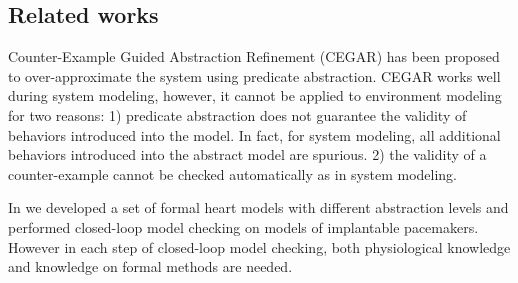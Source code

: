\subsection{Related works}
Counter-Example Guided Abstraction Refinement (CEGAR) \cite{CEGAR} has been proposed to over-approximate the system using predicate abstraction. 
CEGAR works well during system modeling, however, it cannot be applied to environment modeling for two reasons: 1) predicate abstraction does not guarantee the validity of behaviors introduced into the model. In fact, for system modeling, all additional behaviors introduced into the abstract model are spurious. 2) the validity of a counter-example cannot be checked automatically as in system modeling. 


In \cite{sttt13} we developed a set of formal heart models with different abstraction levels and performed closed-loop model checking on models of implantable pacemakers. 
However in each step of closed-loop model checking, both physiological knowledge and knowledge on formal methods are needed.

